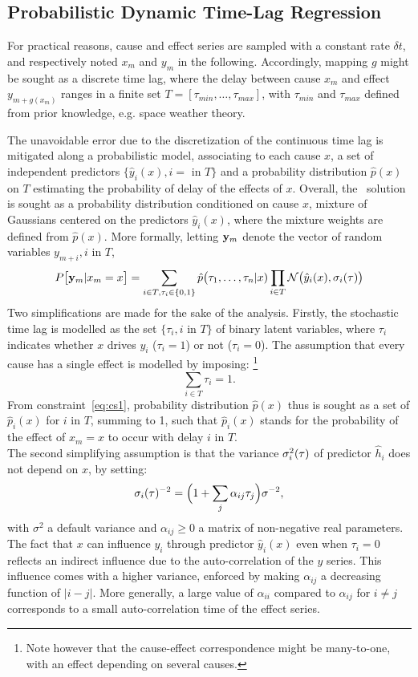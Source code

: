 \subsection{Probabilistic Dynamic Time-Lag Regression}

For practical reasons, cause and effect series are sampled with a constant rate $\delta t$, and respectively 
noted ${x_m}$ and ${y_m}$ in the following. Accordingly, mapping $g$ might be sought as a discrete time lag, 
where the delay between cause $x_m$ and effect $y_{m+g(x_m)}$ ranges in a finite set 
$T = [\tau_{min}, \ldots, \tau_{max}]$, with  $\tau_{min}$ and  $\tau_{max}$ defined from prior knowledge, 
e.g. space weather theory. 

The unavoidable error due to the discretization of the continuous time lag is mitigated along a probabilistic model,
associating to each cause $x$, a set of independent predictors $\{\hat y_i(x),i=$ in $T\}$ and a probability 
distribution $\hat p(x)$ on $T$ estimating the probability of delay of the effects of $x$. Overall, the \XX\ 
solution is sought as a probability distribution conditioned on cause $x$, mixture of Gaussians centered on the 
predictors $\hat y_i(x)$, where the mixture weights are defined from $\hat p(x)$. More formally, letting ${\bf y}_m$ 
denote the vector of random variables $y_{m+i}, i$ in $T$, 
\begin{equation}\label{eq:py}
  P\bigl[{\bf y}_{m}\vert x_m=x\bigr] = \sum_{i \in T, \tau_i\in\{0,1\}}  \hat p\bigl(\tau_1,\ldots,\tau_n\vert x)
\prod_{i\in T} {\cal N}\bigl(\hat y_i(x),\sigma_i(\tau)\bigr)
\end{equation}
Two simplifications are made for the sake of the analysis. Firstly, the stochastic time lag is modelled as the set 
$\{\tau_i, i$ in $ T\}$ of binary latent variables, where $\tau_i$ indicates whether $x$ drives $y_i$ ($\tau_i=1$) 
or not ($\tau_i=0$). The assumption that every cause has a single effect is modelled by imposing:
\footnote{Note however that the cause-effect correspondence might be many-to-one, with an effect depending on 
several causes.}
\begin{equation}\label{eq:cs1}
\sum_{i \in T} \tau_i = 1.
\end{equation}
From constraint~\cref{eq:cs1}, probability distribution $\hat p(x)$ thus is sought as a set of $\hat p_i(x)$ 
for $i$ in $T$, summing to 1, such that $\hat p_i(x)$ stands for the probability of the effect of $x_m=x$ to occur 
with delay $i$ in $T$. \\
The second simplifying assumption is that the variance $\sigma_i^2({\bf \tau})$ of predictor $\hat h_i$ does not 
depend on $x$, by setting:
\[
\sigma_i({\bf \tau})^{-2} = \Bigl(1+\sum_j\alpha_{ij} \tau_j\Bigr)\sigma^{-2},
\]
with $\sigma^2$ a default variance and $\alpha_{ij}\ge 0$ a matrix of non-negative real parameters. 
The fact that $x$ can influence $y_i$ through predictor $\hat y_i(x)$ even when $\tau_i=0$ reflects an indirect
influence due to the auto-correlation of the $y$ series. This influence comes with a higher variance, enforced by 
making $\alpha_{ij}$ a decreasing function of $\vert i-j\vert$. More generally, a large value of $\alpha_{ii}$ 
compared to $\alpha_{ij}$ for $i\ne j$ corresponds to a small auto-correlation time of the effect series. 

